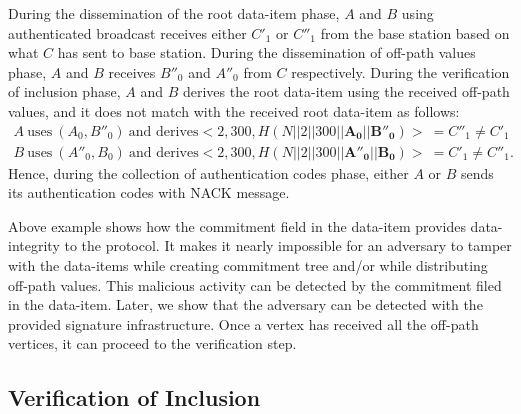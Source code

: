 \begin{exmp}
			During the dissemination of the root data-item phase, $A$ and $B$ using authenticated broadcast receives either $C'_{1}$ or $C''_{1}$ from the base station based on what $C$ has sent to base station.
			During the dissemination of off-path values phase, $A$ and $B$ receives $B''_{0}$ and $A''_{0}$ from $C$ respectively.
			During the verification of inclusion phase, $A$ and $B$ derives the root data-item using the received off-path values, and it does not match with the received root data-item as follows:
			\begin{equation*}
				\begin{array}{l}
					A\ \mbox{uses}\ (A_{0}, B''_{0})\ \mbox{and derives} <2,300,H(N||2||300||\mathbf{A_{0}}||\mathbf{B''_{0}})>\  = C''_{1} \neq C'_{1} \\
					B\ \mbox{uses}\ (A''_{0}, B_{0})\ \mbox{and derives} <2,300,H(N||2||300||\mathbf{A''_{0}}||\mathbf{B_{0}})>\  = C'_{1} \neq C''_{1}.
				\end{array}
			\end{equation*}
			Hence, during the collection of authentication codes phase, either $A$ or $B$ sends its authentication codes with NACK message.
		\end{exmp}
			Above example shows how the commitment field in the data-item provides data-integrity to the protocol.
			It makes it nearly impossible for an adversary to tamper with the data-items while creating commitment tree and/or while distributing off-path values.
			This malicious activity can be detected by the commitment filed in the data-item.
			Later, we show that the adversary can be detected with the provided signature infrastructure.
			Once a vertex has received all the off-path vertices, it can proceed to the verification step.
	
	\subsection{Verification of Inclusion}
	

